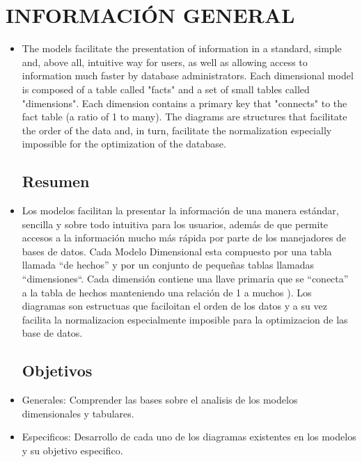 \section{INFORMACIÓN GENERAL} 

\begin{itemize}
\subsection{Abstract}
	\item The models facilitate the presentation of information in a standard, simple and, above all, intuitive way for users, as well as allowing access to information much faster by database administrators. Each dimensional model is composed of a table called "facts" and a set of small tables called "dimensions". Each dimension contains a primary key that "connects" to the fact table (a ratio of 1 to many). The diagrams are structures that facilitate the order of the data and, in turn, facilitate the normalization especially impossible for the optimization of the database.

\subsection{Resumen}
	\item Los modelos facilitan la presentar la información de una manera estándar, sencilla y sobre todo intuitiva para los usuarios, además de que permite accesos a la información mucho más rápida por parte de los manejadores de bases de datos. Cada Modelo Dimensional esta compuesto por una tabla llamada “de hechos” y por un conjunto de pequeñas tablas llamadas “dimensiones“. Cada dimensión contiene una llave primaria que se “conecta” a la tabla de hechos manteniendo una relación de 1 a muchos ). Los diagramas son estructuas que faciloitan el orden de los datos y a su vez facilita la normalizacion especialmente imposible para la optimizacion de las base de datos.

\subsection{Objetivos}
	\item Generales: Comprender las bases sobre el analisis de los modelos dimensionales y tabulares.

	\item Especificos: Desarrollo de cada uno de los diagramas existentes en los modelos y su objetivo especifico.


\end{itemize}

